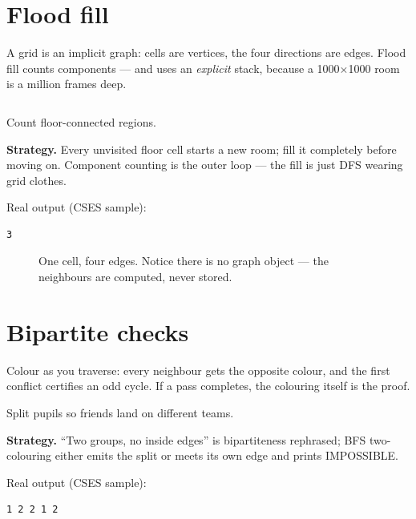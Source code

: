 \section{Flood fill}\label{sec:flood}
A grid is an implicit graph: cells are vertices, the four directions
are edges. Flood fill counts components --- and uses an
\emph{explicit} stack, because a 1000$\times$1000 room is a million
frames deep.
\begin{lstlisting}[language=C++,caption={\texttt{floodfill.h}:
iterative, 4-direction, marks by rewriting the grid.},label={lst:flood}]
\end{lstlisting}

\begin{example}\label{ex:rooms}
Count floor-connected regions.
\par\smallskip
\textbf{Strategy.} Every unvisited floor cell starts a new room; fill
it completely before moving on. Component counting is the outer loop
--- the fill is just DFS wearing grid clothes.
\par\smallskip
\begin{solution}

Real output (CSES sample):
\begin{lstlisting}[numbers=none]
3
\end{lstlisting}
\end{solution}
\end{example}
\begin{figure}[ht]\centering

\caption{One cell, four edges. Notice there is no graph object ---
the neighbours are computed, never stored.}
\label{fig:gridgraph}
\end{figure}

\section{Bipartite checks}\label{sec:bip}
Colour as you traverse: every neighbour gets the opposite colour, and
the first conflict certifies an odd cycle. If a pass completes, the
colouring itself is the proof.
\begin{example}\label{ex:teams}
Split pupils so friends land on different teams.
\par\smallskip
\textbf{Strategy.} ``Two groups, no inside edges'' is bipartiteness
rephrased; BFS two-colouring either emits the split or meets its own
edge and prints IMPOSSIBLE.
\par\smallskip
\begin{solution}

Real output (CSES sample):
\begin{lstlisting}[numbers=none]
1 2 2 1 2
\end{lstlisting}
\end{solution}
\end{example}

